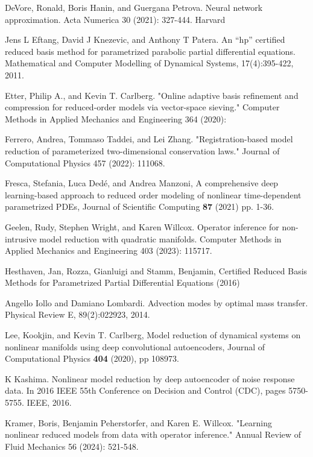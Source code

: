 \begin{thebibliography}{99}
DeVore, Ronald, Boris Hanin, and Guergana Petrova. Neural network approximation. Acta Numerica 30 (2021): 327-444.
Harvard	



Jens L Eftang, David J Knezevic, and Anthony T Patera. An “hp” certified reduced
basis method for parametrized parabolic partial differential equations. Mathematical
and Computer Modelling of Dynamical Systems, 17(4):395-422, 2011.

Etter, Philip A., and Kevin T. Carlberg. "Online adaptive basis refinement and compression for reduced-order models via vector-space sieving." Computer Methods in Applied Mechanics and Engineering 364 (2020): 


Ferrero, Andrea, Tommaso Taddei, and Lei Zhang. "Registration-based model reduction of parameterized two-dimensional conservation laws." Journal of Computational Physics 457 (2022): 111068.


Fresca, Stefania, Luca Dedé, and Andrea Manzoni, A comprehensive deep learning-based approach to reduced order modeling of nonlinear time-dependent parametrized PDEs, Journal of Scientific Computing {\bf 87} (2021) pp. 1-36.

Geelen, Rudy, Stephen Wright, and Karen Willcox. Operator inference for non-intrusive model reduction with quadratic manifolds. Computer Methods in Applied Mechanics and Engineering 403 (2023): 115717.



Hesthaven, Jan, Rozza, Gianluigi and Stamm, Benjamin, Certified Reduced Basis Methods for Parametrized Partial Differential Equations (2016)


Angello Iollo and Damiano Lombardi. Advection modes by optimal mass transfer. Physical Review E, 89(2):022923, 2014.



Lee, Kookjin, and Kevin T. Carlberg, Model reduction of dynamical systems on nonlinear manifolds using deep convolutional autoencoders,  Journal of Computational Physics {\bf 404} (2020), pp 108973.

K Kashima. Nonlinear model reduction by deep autoencoder of noise response data. In 2016 IEEE 55th Conference on Decision and Control (CDC), pages 5750-5755. IEEE, 2016.

Kramer, Boris, Benjamin Peherstorfer, and Karen E. Willcox. "Learning nonlinear reduced models from data with operator inference." Annual Review of Fluid Mechanics 56 (2024): 521-548.



\end{thebibliography}
